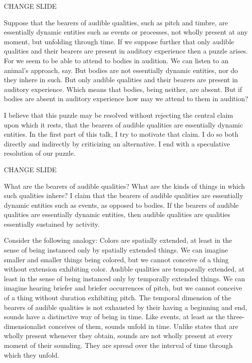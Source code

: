 \documentclass[12pt]{article}
\title{\mytitle}
\author{\myauthor}
\date{} %
\begin{document}
\maketitle

\setlength{\parindent}{1em}


CHANGE SLIDE

Suppose that the bearers of audible qualities, such as pitch and timbre, are essentially dynamic entities such as events or processes, not wholly present at any moment, but unfolding through time. If we suppose further that only audible qualities and their bearers are present in auditory experience then a puzzle arises. For we seem to be able to attend to bodies in audition. We can listen to an animal’s approach, say. But bodies are not essentially dynamic entities, nor do they inhere in such. But only audible qualities and their bearers are present in auditory experience. Which means that bodies, being neither, are absent. But if bodies are absent in auditory experience how may we attend to them in audition?

I believe that this puzzle may be resolved without rejecting the central claim upon which it rests, that the bearers of audible qualities are essentially dynamic entities. In the first part of this talk, I try to motivate that claim. I do so both directly and indirectly by criticizing an alternative. I end with a speculative resolution of our puzzle.

CHANGE SLIDE

What are the bearers of audible qualities? What are the kinds of things in which such qualities inhere? I claim that the bearers of audible qualities are essentially dynamic entities such as events, as opposed to bodies. If the bearers of audible qualities are essentially dynamic entities, then audible qualities are qualities essentially sustained by activity.

Consider the following analogy: Colors are spatially extended, at least in the sense of being instanced only by spatially extended things. We can imagine smaller and smaller things being colored, but we cannot conceive of a thing without extension exhibiting color. Audible qualities are temporally extended, at least in the sense of being instanced only by temporally extended things. We can imagine hearing briefer and briefer occurrences of pitch, but we cannot conceive of a thing without duration exhibiting pitch. The temporal dimension of the bearers of audible qualities is not exhausted by their having a beginning and end, sounds have a distinctive way of being in time. Like events, at least as the three-dimensionalist conceives of them, sounds unfold in time. Unlike states that are wholly present whenever they obtain, sounds are not wholly present at every moment of their sounding. They are spread over the interval of time through which they unfold.
\end{document}
